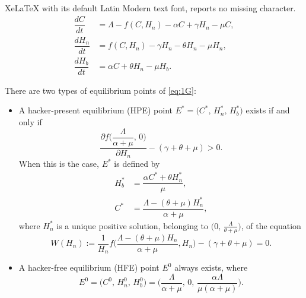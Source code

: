 \documentclass[10pt,a4paper]{amsart}
\begin{document}
XeLaTeX with its default Latin Modern text font, reports no missing character.
\begin{equation}\label{eq:1G}
\begin{split}
 \dfrac{dC}{dt} &= \Lambda - f(C, H_n) -\alpha C + \gamma H_n -\mu C, \\
 \dfrac{dH_n}{dt} &= f(C, H_n) - \gamma H_n - \theta H_n - \mu H_n,\\
 \dfrac{d H_b}{dt} &= \alpha C + \theta H_n - \mu H_b.
\end{split}
\end{equation}

\begin{lemma}\label{Lemma1}
There are two types of equilibrium points of \eqref{eq:1G}:
\begin{itemize} 
\item[(iii)] A hacker-present equilibrium (HPE) point $E^* = \big(C^*,\,H_n^*,\,H_b^*\big)$ exists if and only if 
\begin{equation}\label{eq:14}
     \dfrac{\partial f\bigg(\dfrac{\Lambda}{\alpha + \mu},\,0\bigg)}{\partial H_n} - (\gamma + \theta + \mu) > 0.
\end{equation}
When this is the case, $E^*$ is defined by
\begin{equation}\label{eq:11}
\begin{split}
  H_b^* &= \dfrac{\alpha C^* + \theta H_n^*}{\mu},\\
  C^* &= \dfrac{\Lambda - (\theta + \mu)H_n^*}{\alpha + \mu}, 
\end{split}
\end{equation}
where $H_n^*$ is a unique positive solution, belonging to $\big(0,\,\frac{\Lambda}{\theta + \mu}\big)$, of the equation
\begin{equation}\label{eq:12}
    W(H_n) := \dfrac{1}{H_n}f\bigg(\dfrac{\Lambda - (\theta + \mu)H_n}{\alpha + \mu}, H_n\bigg) - (\gamma + \theta + \mu) = 0.
\end{equation}
\item[(ii)] A hacker-free equilibrium (HFE) point $E^0$ always exists, where
\begin{equation}\label{eq:15}
E^0 = \big(C^0,\,H_n^0,\,H_b^0\big) = \bigg(\dfrac{\Lambda}{\alpha + \mu},\,0,\,\dfrac{\alpha\Lambda}{\mu(\alpha + \mu)}\bigg).
\end{equation}
\end{itemize}
\end{lemma}
\end{document}
